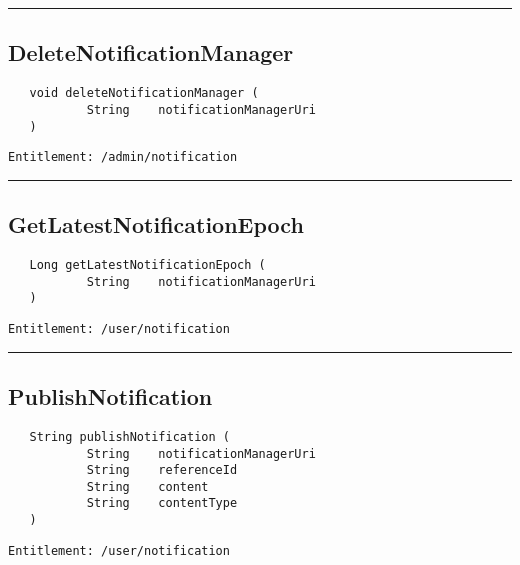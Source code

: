 \rule{12cm}{2pt}
\subsection{DeleteNotificationManager}
\label{Api:DeleteNotificationManager}
\begin{verbatim}
   void deleteNotificationManager (
           String    notificationManagerUri
   )
\end{verbatim}
\begin{Verbatim}[fontsize=\small, formatcom=\color{Maroon}]
  Entitlement: /admin/notification
\end{Verbatim}



\rule{12cm}{2pt}
\subsection{GetLatestNotificationEpoch}
\label{Api:GetLatestNotificationEpoch}
\begin{verbatim}
   Long getLatestNotificationEpoch (
           String    notificationManagerUri
   )
\end{verbatim}
\begin{Verbatim}[fontsize=\small, formatcom=\color{Maroon}]
  Entitlement: /user/notification
\end{Verbatim}



\rule{12cm}{2pt}
\subsection{PublishNotification}
\label{Api:PublishNotification}
\begin{verbatim}
   String publishNotification (
           String    notificationManagerUri
           String    referenceId
           String    content
           String    contentType
   )
\end{verbatim}
\begin{Verbatim}[fontsize=\small, formatcom=\color{Maroon}]
  Entitlement: /user/notification
\end{Verbatim}



